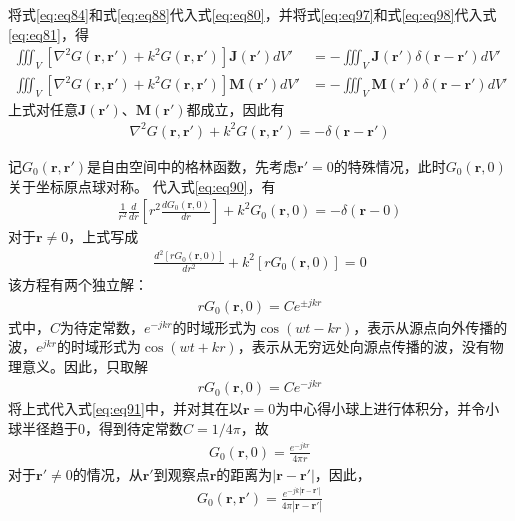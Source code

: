 \documentclass{article}
\numberwithin{equation}{section}
\renewcommand{\vec}[1]{\boldsymbol{#1}}
\begin{document}
将式\ref{eq:eq84}和式\ref{eq:eq88}代入式\ref{eq:eq80}，并将式\ref{eq:eq97}和式\ref{eq:eq98}代入式\ref{eq:eq81}，得
\begin{align}
    \label{eq:eq89}
    \iiint_V[\nabla^2G(\vec{r},\vec{r}')+k^2G(\vec{r},\vec{r}')]\mathbf{J}(\vec{r}')dV'&=-\iiint_V\mathbf{J}(\vec{r}')\delta(\vec{r}-\vec{r}')dV' \\
    \label{eq:eq99}
    \iiint_V[\nabla^2G(\vec{r},\vec{r}')+k^2G(\vec{r},\vec{r}')]\mathbf{M}(\vec{r}')dV'&=-\iiint_V\mathbf{M}(\vec{r}')\delta(\vec{r}-\vec{r}')dV'
\end{align}
上式对任意$\mathbf{J}(\vec{r}')$、$\mathbf{M}(\vec{r}')$都成立，因此有
\begin{align}
    \label{eq:eq90}
    \nabla^2G(\vec{r},\vec{r}')+k^2G(\vec{r},\vec{r}')=-\delta(\vec{r}-\vec{r}')
\end{align}
\par
记$G_0(\vec{r},\vec{r}')$是自由空间中的格林函数，先考虑$\vec{r}'=0$的特殊情况，此时$G_0(\vec{r},0)$关于坐标原点球对称。
代入式\ref{eq:eq90}，有
\begin{align}
    \label{eq:eq91}
    \frac{1}{r^2}\frac{d}{dr}\left[r^2\frac{dG_0(\vec{r},0)}{dr}\right]+k^2G_0(\vec{r},0)=-\delta(\vec{r}-0)
\end{align}
对于$\vec{r}\neq 0$，上式写成
\begin{align}
    \label{eq:eq92}
    \frac{d^2[rG_0(\vec{r},0)]}{dr^2}+k^2[rG_0(\vec{r},0)]=0
\end{align}
该方程有两个独立解：
\begin{align}
    \label{eq:eq93}
    rG_0(\vec{r},0)=Ce^{\pm jkr}
\end{align}
式中，$C$为待定常数，$e^{-jkr}$的时域形式为$\cos(wt-kr)$，表示从源点向外传播的波，$e^{jkr}$的时域形式为$\cos(wt+kr)$，表示从无穷远处向源点传播的波，没有物理意义。因此，只取解
\begin{align}
    \label{eq:eq94}
    rG_0(\vec{r},0)=Ce^{-jkr}
\end{align}
将上式代入式\ref{eq:eq91}中，并对其在以$\vec{r}=0$为中心得小球上进行体积分，并令小球半径趋于0，得到待定常数$C=1/4\pi$，故
\begin{align}
    \label{eq:eq95}
    G_0(\vec{r},0)=\frac{e^{-jkr}}{4\pi r}
\end{align}
对于$\vec{r}'\neq0$的情况，从$\vec{r}'$到观察点$\vec{r}$的距离为$|\vec{r}-\vec{r}'|$，因此，
\begin{align}
    \label{eq:eq96}
    G_0(\vec{r},\vec{r}')=\frac{e^{-jk|\vec{r}-\vec{r}'|}}{4\pi |\vec{r}-\vec{r}'|}
\end{align}
\end{document}
